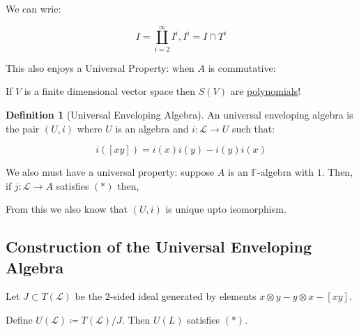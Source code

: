 \documentclass{article}
\theoremstyle{definition}
\newtheorem*{definition}{Definition}
\begin{document}
    We can wrie:

    \[
        I = \coprod_{i=2}^{\infty} I^i, I^i = I \cap T^i
    \]

    This also enjoys a Universal Property: when \(A\) is commutative:

    \begin{center}
    \end{center}
    
    If \(V\) is a finite dimensional vector space then \(S(V)\) are \underline{polynomials}!

    \begin{definition}
        [Universal Enveloping Algebra]
        An universal enveloping algebra is the pair \((U,i)\) where \(U\) is an algebra and \(i: \mathcal{L} \to U\) such that:

        \[
            i([xy]) = i(x) i(y) - i(y) i(x) \tag*{\(\ast\)}
        \]

        We also must have a universal property: suppose \(A\) is an \(\mathbb{F}\)-algebra with \(1\). Then, if \(j: \mathcal{L} \to A\) satisfies \((\ast)\) then,

        \begin{center}
        \end{center}

        From this we also know that \((U,i)\) is unique upto isomorphism.

    \end{definition}

    \subsection*{Construction of the Universal Enveloping Algebra}

    Let \(J \subset T(\mathcal{L})\) be the \(2\)-sided ideal generated by elements \(x \otimes y - y \otimes x - [xy]\).
    
    Define \(U(\mathcal{L}) \coloneqq T(\mathcal{L}) / J\). Then \(U(L)\) satisfies \((\ast)\).
\end{document}
